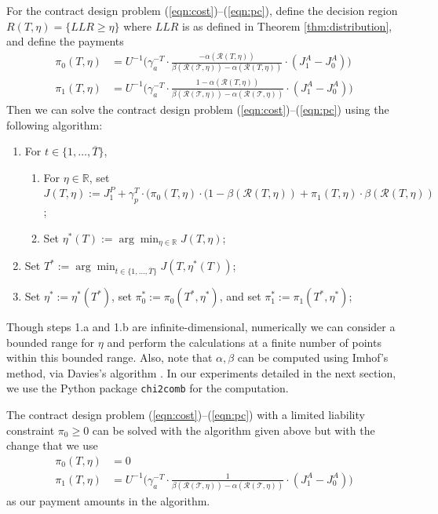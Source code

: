 \documentclass[letterpaper, 10 pt, conference]{ieeeconf}  %
\begin{document}
For the contract design problem (\ref{eqn:cost})--(\ref{eqn:pc}), define the decision region $R(T,\eta) = \{LLR \geq \eta\}$ where $LLR$ is as defined in Theorem \ref{thm:distribution}, and define the payments
\begin{align}
\pi_0(T,\eta) &= \textstyle U^{-1}\Big(\gamma_a^{-T}\cdot\frac{-\alpha(\mathcal{R}(T,\eta))}{\beta(\mathcal{R(T,\eta)}) - \alpha(\mathcal{R}(T,\eta))}\cdot(J_1^A-J_0^A)\Big)\\
\pi_1(T,\eta) &= \textstyle U^{-1}\Big(\gamma_a^{-T}\cdot\frac{1-\alpha(\mathcal{R}(T,\eta))}{\beta(\mathcal{R(T,\eta)}) - \alpha(\mathcal{R(T,\eta)})}\cdot(J_1^A-J_0^A)\Big)
\end{align}
Then we can solve the contract design problem (\ref{eqn:cost})--(\ref{eqn:pc}) using the following algorithm:
\begin{enumerate}
    \item For $t \in \{1,\ldots,\overline{T}\}$,
    \begin{enumerate}
        \item For $\eta \in \mathbb{R}$, set $J(T,\eta) := J_1^P + \gamma_p^{T} \cdot (\pi_0(T,\eta) \cdot (1-\beta(\mathcal{R}(T,\eta)) + \pi_1(T,\eta) \cdot \beta(\mathcal{R}(T,\eta))$;
        \item Set $\eta^*(T) := \arg\min_{\eta \in \mathbb{R}}J(T,\eta)$;
    \end{enumerate}
    \item Set $T^* := \arg\min_{t\in\{1,\ldots,\overline{T}\}} J(T,\eta^*(T))$;
    \item Set $\eta^* := \eta^*(T^*)$, set $\pi_0^* := \pi_0(T^*,\eta^*)$, and set $\pi_1^* := \pi_1(T^*,\eta^*)$;
\end{enumerate}
Though steps 1.a and 1.b are infinite-dimensional, numerically we can consider a bounded range for $\eta$ and perform the calculations at a finite number of points within this bounded range. Also, note that $\alpha,\beta$ can be computed using Imhof's method, via Davies's algorithm \cite{Imhof1961, Davies1980, Das2025}. In our experiments detailed in the next section, we use the Python package \texttt{chi2comb} \cite{horta2021chi2comb} for the computation.


The contract design problem (\ref{eqn:cost})--(\ref{eqn:pc}) with a limited liability constraint $\pi_0 \geq 0$ can be solved with the algorithm given above but with the change that we use
\begin{align}
\pi_0(T,\eta) &= 0\\
\pi_1(T,\eta) &= \textstyle U^{-1}\Big(\gamma_a^{-T}\cdot\frac{1}{\beta(\mathcal{R(T,\eta)}) - \alpha(\mathcal{R(T,\eta)})}\cdot(J_1^A-J_0^A)\Big)
\end{align}
as our payment amounts in the algorithm.
\end{document}
